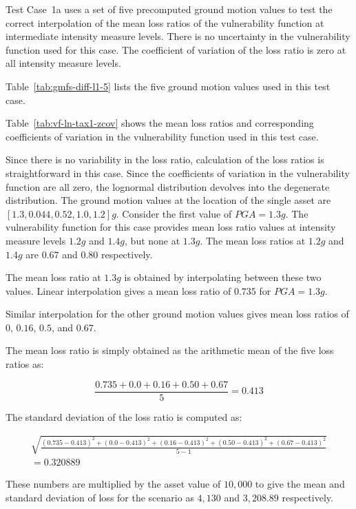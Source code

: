 Test Case~1a uses a set of five precomputed ground motion values to test the correct interpolation of the mean loss ratios of the vulnerability function at intermediate intensity measure levels. There is no uncertainty in the vulnerability function used for this case. The coefficient of variation of the loss ratio is zero at all intensity measure levels.



Table~\ref{tab:gmfs-diff-l1-5} lists the five ground motion values used in this test case.



Table~\ref{tab:vf-ln-tax1-zcov} shows the mean loss ratios and corresponding coefficients of variation in the vulnerability function used in this test case.

Since there is no variability in the loss ratio, calculation of the loss ratios is straightforward in this case. Since the coefficients of variation in the vulnerability function are all zero, the lognormal distribution devolves into the degenerate distribution. The ground motion values at the location of the single asset are $[1.3, 0.044, 0.52, 1.0, 1.2] g$. Consider the first value of $PGA = 1.3 g$. The vulnerability function for this case provides mean loss ratio values at intensity measure levels $1.2 g$ and $1.4 g$, but none at $1.3 g$. The mean loss ratios at $1.2 g$ and $1.4 g$ are $0.67$ and $0.80$ respectively.

The mean loss ratio at $1.3 g$ is obtained by interpolating between these two values. Linear interpolation gives a mean loss ratio of $0.735$ for $PGA = 1.3 g$.

Similar interpolation for the other ground motion values gives mean loss ratios of $0$, $0.16$, $0.5$, and $0.67$.

The mean loss ratio is simply obtained as the arithmetic mean of the five loss ratios as:

\begin{equation*}
\frac{0.735 + 0.0 + 0.16 + 0.50 + 0.67}{5} = 0.413
\end{equation*}

The standard deviation of the loss ratio is computed as:

\begin{multline*}
\sqrt{\frac{(0.735 - 0.413)^2 + (0.0 - 0.413)^2 + (0.16 - 0.413)^2 + (0.50 - 0.413)^2 + (0.67 - 0.413)^2}{5 - 1}} \\
= 0.320889
\end{multline*}

These numbers are multiplied by the asset value of $10,000$ to give the mean and standard deviation of loss for the scenario as $4,130$ and $3,208.89$ respectively.